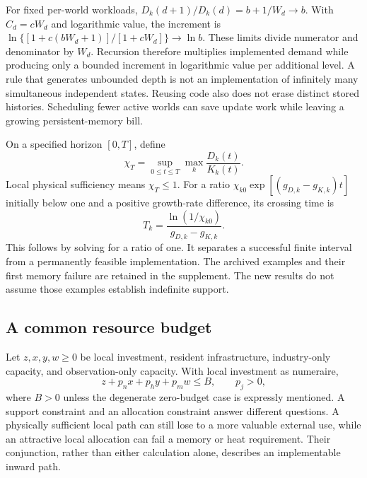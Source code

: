 \documentclass[11pt,a4paper]{article}
\theoremstyle{definition}\newtheorem{definition}{Definition}
\begin{document}
For fixed per-world workloads,
$D_k(d+1)/D_k(d)=b+1/W_d\to b$. With $C_d=cW_d$ and logarithmic
value, the increment is
$\ln\{[1+c(bW_d+1)]/[1+cW_d]\}\to\ln b$.
These limits divide numerator and denominator by $W_d$. Recursion
therefore multiplies implemented demand while producing only a bounded
increment in logarithmic value per additional level. A rule that generates
unbounded depth is not an implementation of infinitely many simultaneous
independent states. Reusing code also does not erase distinct stored
histories. Scheduling fewer active worlds can save update work while
leaving a growing persistent-memory bill.

On a specified horizon $[0,T]$, define
\begin{equation}
 \chi_T=\sup_{0\leq t\leq T}\max_k\frac{D_k(t)}{K_k(t)}.
 \label{eq:chi}
\end{equation}
Local physical sufficiency means $\chi_T\leq1$. For a ratio
$\chi_{k0}\exp[(g_{D,k}-g_{K,k})t]$ initially below one and a positive
growth-rate difference, its crossing time is
\begin{equation}
 T_k=\frac{\ln(1/\chi_{k0})}{g_{D,k}-g_{K,k}}.\label{eq:crossing}
\end{equation}
This follows by solving for a ratio of one. It separates a successful
finite interval from a permanently feasible implementation. The archived
examples and their first memory failure are retained in the supplement.
The new results do not assume those examples establish indefinite support.

\subsection{A common resource budget}
Let $z,x,y,w\geq0$ be local investment, resident infrastructure,
industry-only capacity, and observation-only capacity. With local
investment as numeraire,
\begin{equation}
 z+p_nx+p_hy+p_mw\leq B,\qquad p_j>0,
 \label{eq:budget}
\end{equation}
where $B>0$ unless the degenerate zero-budget case is expressly mentioned.
A support constraint and an allocation constraint answer different
questions. A physically sufficient local path can still lose to a more
valuable external use, while an attractive local allocation can fail a
memory or heat requirement. Their conjunction, rather than either
calculation alone, describes an implementable inward path.

\label{sec:production}
\end{document}
